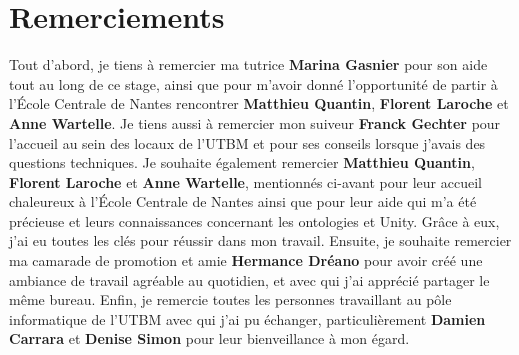 \section*{Remerciements}

\vspace{2cm}
Tout d'abord, je tiens à remercier ma tutrice \textbf{Marina Gasnier} pour son aide tout au long de ce stage, ainsi que pour m'avoir donné l'opportunité de partir à l'École Centrale de Nantes rencontrer \textbf{Matthieu Quantin}, \textbf{Florent Laroche} et \textbf{Anne Wartelle}.
\newline
\newline
Je tiens aussi à remercier mon suiveur \textbf{Franck Gechter} pour l'accueil au sein des locaux de l'UTBM et pour ses conseils lorsque j'avais des questions techniques. 
\newline
\newline
Je souhaite également remercier \textbf{Matthieu Quantin}, \textbf{Florent Laroche} et \textbf{Anne Wartelle}, mentionnés ci-avant pour leur accueil chaleureux à l'École Centrale de Nantes ainsi que pour leur aide qui m'a été précieuse et leurs connaissances concernant les ontologies et Unity. Grâce à eux, j'ai eu toutes les clés pour réussir dans mon travail.
\newline
\newline
Ensuite, je souhaite remercier ma camarade de promotion et amie \textbf{Hermance Dréano} pour avoir créé une ambiance de travail agréable au quotidien, et avec qui j'ai apprécié partager le même bureau.
\newline
\newline
Enfin, je remercie toutes les personnes travaillant au pôle informatique de l'UTBM avec qui j'ai pu échanger, particulièrement \textbf{Damien Carrara} et \textbf{Denise Simon} pour leur bienveillance à mon égard.